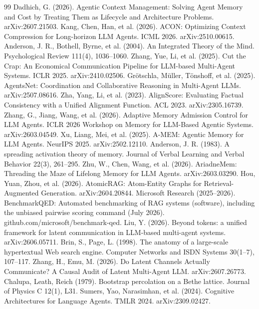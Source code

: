 \documentclass[11pt]{article}
\begin{document}
\begin{thebibliography}{99}
 Dadhich, G. (2026). Agentic Context Management: Solving Agent Memory and Cost by Treating Them as Lifecycle and Architecture Problems. arXiv:2607.21503.
 Kang, Chen, Han, et al. (2026). ACON: Optimizing Context Compression for Long-horizon LLM Agents. ICML 2026. arXiv:2510.00615.
 Anderson, J. R., Bothell, Byrne, et al. (2004). An Integrated Theory of the Mind. Psychological Review 111(4), 1036--1060.
 Zhang, Yue, Li, et al. (2025). Cut the Crap: An Economical Communication Pipeline for LLM-based Multi-Agent Systems. ICLR 2025. arXiv:2410.02506.
 Gr{\"{o}}tschla, M{\"{u}}ller, T{\"{o}}nshoff, et al. (2025). AgentsNet: Coordination and Collaborative Reasoning in Multi-Agent LLMs. arXiv:2507.08616.
 Zha, Yang, Li, et al. (2023). AlignScore: Evaluating Factual Consistency with a Unified Alignment Function. ACL 2023. arXiv:2305.16739.
 Zhang, G., Jiang, Wang, et al. (2026). Adaptive Memory Admission Control for LLM Agents. ICLR 2026 Workshop on Memory for LLM-Based Agentic Systems. arXiv:2603.04549.
 Xu, Liang, Mei, et al. (2025). A-MEM: Agentic Memory for LLM Agents. NeurIPS 2025. arXiv:2502.12110.
 Anderson, J. R. (1983). A spreading activation theory of memory. Journal of Verbal Learning and Verbal Behavior 22(3), 261--295.
 Zhu, W., Chen, Wang, et al. (2026). AriadneMem: Threading the Maze of Lifelong Memory for LLM Agents. arXiv:2603.03290.
 Hou, Yuan, Zhou, et al. (2026). AtomicRAG: Atom-Entity Graphs for Retrieval-Augmented Generation. arXiv:2604.20844.
 Microsoft Research (2025--2026). BenchmarkQED: Automated benchmarking of RAG systems (software), including the unbiased pairwise scoring command (July 2026). github.com/microsoft/benchmark-qed.
 Liu, Y. (2026). Beyond tokens: a unified framework for latent communication in LLM-based multi-agent systems. arXiv:2606.05711.
 Brin, S., Page, L. (1998). The anatomy of a large-scale hypertextual Web search engine. Computer Networks and ISDN Systems 30(1--7), 107--117.
 Zhang, H., Emu, M. (2026). Do Latent Channels Actually Communicate? A Causal Audit of Latent Multi-Agent LLM. arXiv:2607.26773.
 Chalupa, Leath, Reich (1979). Bootstrap percolation on a Bethe lattice. Journal of Physics C 12(1), L31.
 Sumers, Yao, Narasimhan, et al. (2024). Cognitive Architectures for Language Agents. TMLR 2024. arXiv:2309.02427.

\end{thebibliography}
\end{document}
